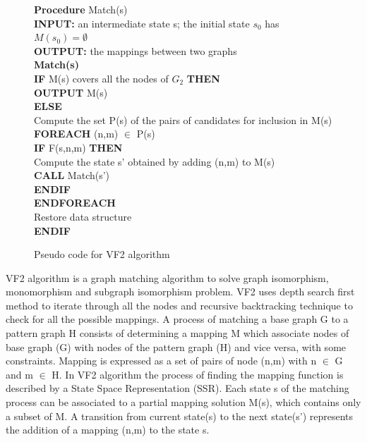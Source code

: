 \begin{figure}

\begin{algorithm}[H]
\begin{algorithmic}
 \LState  \textbf{Procedure} Match(s)\\
\textbf{INPUT:}  an intermediate state s; the initial state $s_0$ has $M(s_0)=\emptyset$\\
\textbf{OUTPUT:} the mappings between two graphs\\
\textbf{Match(s)}\\
 \textbf{IF} M(s) covers all the nodes of $G_2$ \textbf{THEN}\\
\quad \textbf{OUTPUT} M(s)\\
\textbf{ELSE}\\
 \quad    Compute the set P(s) of the pairs of candidates for inclusion in M(s)\\
\quad\textbf{FOREACH} (n,m) $\in$ P(s)\\
\quad\quad\textbf{IF} F(s,n,m) \textbf{THEN}\\
\quad\quad\quad	Compute the state s' obtained by adding (n,m) to M(s)\\
\quad\quad\quad\textbf{CALL} Match(s')\\
\quad\quad\textbf{ENDIF}\\
\quad\textbf{ENDFOREACH}\\
\quad Restore data structure\\
\textbf{ENDIF}\\

\end{algorithmic}
\end{algorithm}
\caption{Pseudo code for VF2 algorithm}
\label{fig:VF2}
\end{figure}


VF2 algorithm is a graph matching algorithm to solve graph isomorphism, monomorphism and  subgraph isomorphism problem. VF2 uses depth search first method to iterate through all the nodes and recursive backtracking technique to check for all the possible mappings. A process of matching 
a base graph G to a pattern graph H consists of determining a mapping M which associate nodes of base graph (G) with nodes of the pattern graph (H) and vice versa, with some constraints.
Mapping is expressed as a set of pairs of node (n,m) with n $\in$ G and m $\in$ H. 
In VF2 algorithm the process of finding the mapping function is described by a  State Space Representation (SSR). Each state s of the matching process can be associated to a partial mapping solution M(s),
which contains only a subset of M. A transition from current state(s) to the next state(s') represents the addition of a mapping (n,m) to the state s.

